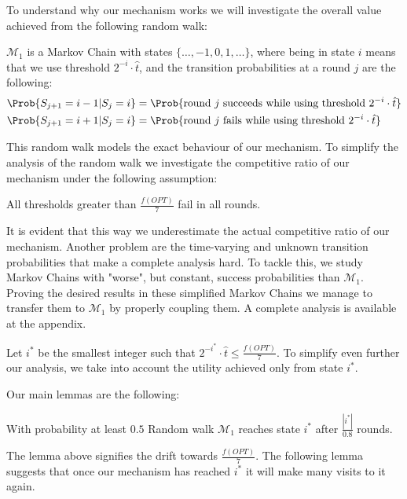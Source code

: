  To understand why our mechanism works we will investigate the overall value achieved from the following random walk:
 \begin{definition}
     $\mathcal{M}_1$ is a Markov Chain with states $\{\dots,-1,0,1,\dots\}$, where being in state $i$ means that we use threshold $2^{-i}\cdot \hat{t}$, and 
 the transition probabilities at a round $j$ are the following:
 \begin{equation}
 \begin{split}
          \Prob{S_{j+1} = i-1| S_{j} = i} &= \Prob{\text{round } j \text{ succeeds while using threshold } 2^{-i}\cdot \hat{t}}\\
     \Prob{S_{j+1} = i+1| S_{j} = i}& = \Prob{\text{round } j \text{ fails while using threshold } 2^{-i}\cdot \hat{t}}
 \end{split}
 \end{equation}
 \end{definition}
This random walk models the exact behaviour of our mechanism. To simplify the analysis of the random walk we investigate the competitive ratio of our mechanism under the following assumption:
\begin{assumption}\label{ass1}
All thresholds greater than $\frac{f(OPT)}{7}$ fail in all rounds.    
\end{assumption}
 It is evident that this way we underestimate the actual competitive ratio of our mechanism. Another problem are the time-varying and unknown transition probabilities that make a complete analysis hard. To tackle this, we study Markov Chains with "worse", but constant, success probabilities than $\mathcal{M}_1$. Proving the desired results in these simplified Markov Chains we manage to transfer them to $\mathcal{M}_1$ by properly coupling them. A complete analysis is available at the appendix.

Let $i^{*}$ be the smallest integer such that $2^{-i^{*}}\cdot \hat{t} \le \frac{f(OPT)}{7}$. To simplify even further our analysis, we take into account the utility achieved only from state $i^{*}$. 

 Our main lemmas are the following:
\begin{lemma}\label{lemSteps}
    With probability at least $0.5$ Random walk $\mathcal{M}_1$ reaches state $i^{*}$ after $\frac{|i^{*}|}{0.8}$ rounds.
\end{lemma}

The lemma above signifies the drift towards $\frac{f(OPT)}{7}$. The following lemma suggests that once our mechanism has reached $i^{*}$ it will make many visits to it again. 


